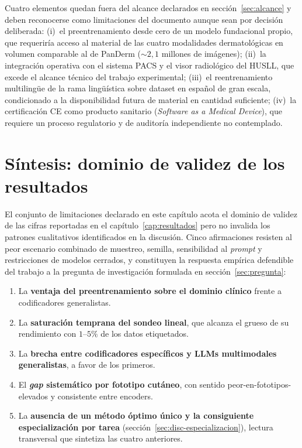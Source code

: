 Cuatro elementos quedan fuera del alcance declarados en
sección~\ref{sec:alcance} y deben reconocerse como limitaciones del
documento aunque sean por decisión deliberada: (i)~el
preentrenamiento desde cero de un modelo fundacional propio, que
requeriría acceso al material de las cuatro modalidades
dermatológicas en volumen comparable al de PanDerm
($\sim 2{,}1$ millones de imágenes); (ii)~la integración
operativa con el sistema PACS y el visor radiológico del HUSLL,
que excede el alcance técnico del trabajo experimental;
(iii)~el reentrenamiento multilingüe de la rama lingüística sobre
dataset en español de gran escala, condicionado a la disponibilidad
futura de material en cantidad suficiente; (iv)~la certificación
CE como producto sanitario (\emph{Software as a Medical Device}),
que requiere un proceso regulatorio y de auditoría independiente
no contemplado.

\section{Síntesis: dominio de validez de los resultados}
\label{sec:lim-sintesis}

El conjunto de limitaciones declarado en este capítulo acota el
dominio de validez de las cifras reportadas en el
capítulo~\ref{cap:resultados} pero no invalida los patrones
cualitativos identificados en la discusión. Cinco afirmaciones resisten
al peor escenario combinado de muestreo, semilla, sensibilidad al
\emph{prompt} y restricciones de modelos cerrados, y constituyen la
respuesta empírica defendible del trabajo a la pregunta de investigación
formulada en sección~\ref{sec:pregunta}:

\begin{enumerate}
  \item La \textbf{ventaja del preentrenamiento sobre el dominio
  clínico} frente a codificadores generalistas.
  \item La \textbf{saturación temprana del sondeo lineal}, que alcanza
  el grueso de su rendimiento con $1$--$5\%$ de los datos etiquetados.
  \item La \textbf{brecha entre codificadores específicos y LLMs
  multimodales generalistas}, a favor de los primeros.
  \item El \textbf{\emph{gap} sistemático por fototipo cutáneo}, con
  sentido peor-en-fototipos-elevados y consistente entre encoders.
  \item La \textbf{ausencia de un método óptimo único y la consiguiente
  especialización por tarea} (sección~\ref{sec:disc-especializacion}),
  lectura transversal que sintetiza las cuatro anteriores.
\end{enumerate}

